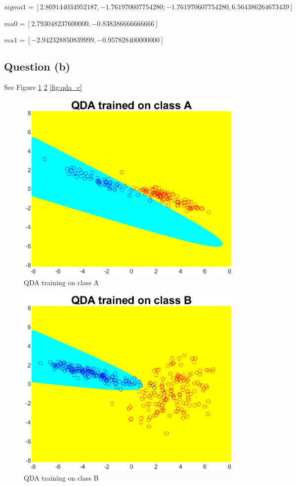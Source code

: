 \documentclass{article}
\begin{document}
	$sigma1 = [2.869144034952187,-1.761970607754280;-1.761970607754280,6.564386264673439]$
	
	$mu0 = [2.793048237600000,-0.838386666666666]$
	
	$mu1 = [-2.942328850839999,-0.957828400000000]$
	
	
	\subsection{Question (b)}
	See Figure \ref{fig:qda_a} \ref{fig:qda_b} \ref{fig:qda_c}
	\begin{figure}
		\centering
		\includegraphics[scale=0.6]{qda_a.eps}
		\caption{QDA training on class A}
		\label{fig:qda_a}
	\end{figure}
	\begin{figure}
		\centering
		\includegraphics[scale=0.6]{qda_b.eps}
		\caption{QDA training on class B}
		\label{fig:qda_b}
	\end{figure}
\end{document}
